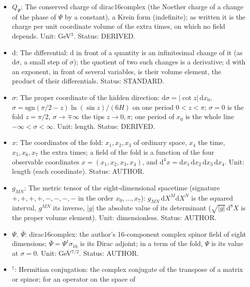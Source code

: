 \documentclass[
  10pt,
]{article}
\providecommand{\tightlist}{%
  \setlength{\itemsep}{0pt}\setlength{\parskip}{0pt}}
\begin{document}
\begin{itemize}
\tightlist
\item
  \(Q_\Psi\): The conserved charge of dirac16complex (the Noether charge
  of a change of the phase of \(\Psi\) by a constant), a Krein form
  (indefinite); as written it is the charge per unit coordinate volume
  of the extra times, on which no field depends. Unit: GeV\(^3\).
  Status: DERIVED.
\item
  \(\mathrm{d}\): The differential: \(\mathrm{d}\) in front of a
  quantity is an infinitesimal change of it (as \(\mathrm{d}\sigma\), a
  small step of \(\sigma\)); the quotient of two such changes is a
  derivative; \(\mathrm{d}\) with an exponent, in front of several
  variables, is their volume element, the product of their
  differentials. Status: STANDARD.
\item
  \(\sigma\): The proper coordinate of the hidden direction:
  \(\mathrm{d}\sigma = \lvert\cot z\rvert\,\mathrm{d}x_0\),
  \(\sigma = \mathrm{sgn}(\pi/2 - z)\ln(\sin z)/(6H)\) on one period
  \(0 < z < \pi\); \(\sigma = 0\) is the fold \(z = \pi/2\),
  \(\sigma \to \mp\infty\) the tips \(z \to 0, \pi\); one period of
  \(x_0\) is the whole line \(-\infty < \sigma < \infty\). Unit: length.
  Status: DERIVED.
\item
  \(x\): The coordinates of the fold: \(x_1, x_2, x_3\) of ordinary
  space, \(x_4\) the time, \(x_5, x_6, x_7\) the extra times; a field of
  the fold is a function of the four observable coordinates
  \(x = (x_1, x_2, x_3, x_4)\), and
  \(\mathrm{d}^4x = \mathrm{d}x_1\,\mathrm{d}x_2\,\mathrm{d}x_3\,\mathrm{d}x_4\).
  Unit: length (each coordinate). Status: AUTHOR.
\item
  \(g_{MN}\): The metric tensor of the eight-dimensional spacetime
  (signature \(+,+,+,+,-,-,-,-\) in the order \(x_0, \dots, x_7\)):
  \(g_{MN}\,\mathrm{d}X^M\mathrm{d}X^N\) is the squared interval,
  \(g^{MN}\) its inverse, \(\lvert g\rvert\) the absolute value of its
  determinant (\(\sqrt{\lvert g\rvert}\,\mathrm{d}^8X\) is the proper
  volume element). Unit: dimensionless. Status: AUTHOR.
\item
  \(\Psi,\ \bar\Psi\): dirac16complex: the author's 16-component complex
  spinor field of eight dimensions;
  \(\bar\Psi = \Psi^\dagger\sigma_{16}\) is its Dirac adjoint; in a term
  of the fold, \(\Psi\) is its value at \(\sigma = 0\). Unit:
  GeV\(^{7/2}\). Status: AUTHOR.
\item
  \({}^\dagger\): Hermitian conjugation: the complex conjugate of the
  transpose of a matrix or spinor; for an operator on the space of

\end{itemize}
\end{document}
